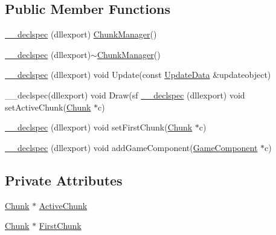 \subsection*{Public Member Functions}
\begin{DoxyCompactItemize}
\item 
\hyperlink{class_chunk_manager_a5174dca056d736be1e45b71dfc0930ef}{\-\_\-\-\_\-declspec} (dllexport) \hyperlink{class_chunk_manager}{Chunk\-Manager}()
\item 
\hyperlink{class_chunk_manager_a3ea11ca30e6e72f84a1f1bcfe6110543}{\-\_\-\-\_\-declspec} (dllexport)$\sim$\hyperlink{class_chunk_manager}{Chunk\-Manager}()
\item 
\hyperlink{class_chunk_manager_a765c3019448f155961fff4dfeee300ca}{\-\_\-\-\_\-declspec} (dllexport) void Update(const \hyperlink{class_update_data}{Update\-Data} \&updateobject)
\item 
\-\_\-\-\_\-declspec(dllexport) void Draw(sf \hyperlink{class_chunk_manager_a1e77e66b79c2f65848acf922eceebc08}{\-\_\-\-\_\-declspec} (dllexport) void set\-Active\-Chunk(\hyperlink{class_chunk}{Chunk} $\ast$c)
\item 
\hyperlink{class_chunk_manager_aefbc2b592e93d6651226f055eb701d47}{\-\_\-\-\_\-declspec} (dllexport) void set\-First\-Chunk(\hyperlink{class_chunk}{Chunk} $\ast$c)
\item 
\hyperlink{class_chunk_manager_a132a5714695e761d05b32321c721a1d8}{\-\_\-\-\_\-declspec} (dllexport) void add\-Game\-Component(\hyperlink{class_game_component}{Game\-Component} $\ast$c)
\end{DoxyCompactItemize}
\subsection*{Private Attributes}
\begin{DoxyCompactItemize}
\item 
\hyperlink{class_chunk}{Chunk} $\ast$ \hyperlink{class_chunk_manager_a8008f62926fe10f46ac59001aae2d372}{Active\-Chunk}
\item 
\hyperlink{class_chunk}{Chunk} $\ast$ \hyperlink{class_chunk_manager_afb87cd5dd3cb61f09a6038d1796719ba}{First\-Chunk}
\end{DoxyCompactItemize}


